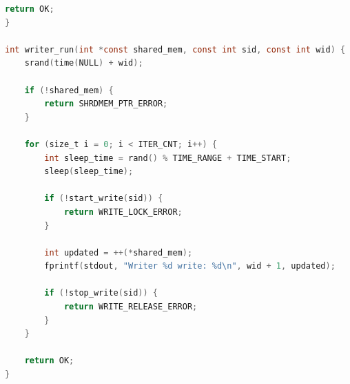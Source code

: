 \documentclass[12pt]{report}
\begin{document}
\begin{lstlisting}[label=reader,caption=Реализация <<читателей>> и <<писателей>>,language=C]
	return OK;
}

int writer_run(int *const shared_mem, const int sid, const int wid) {
	srand(time(NULL) + wid);
	
	if (!shared_mem) {
		return SHRDMEM_PTR_ERROR;
	}
	
	for (size_t i = 0; i < ITER_CNT; i++) {
		int sleep_time = rand() % TIME_RANGE + TIME_START;
		sleep(sleep_time);
		
		if (!start_write(sid)) {
			return WRITE_LOCK_ERROR;
		}
		
		int updated = ++(*shared_mem);
		fprintf(stdout, "Writer %d write: %d\n", wid + 1, updated);
		
		if (!stop_write(sid)) {
			return WRITE_RELEASE_ERROR;
		}
	}
	
	return OK;
}
\end{lstlisting}
\end{document}
